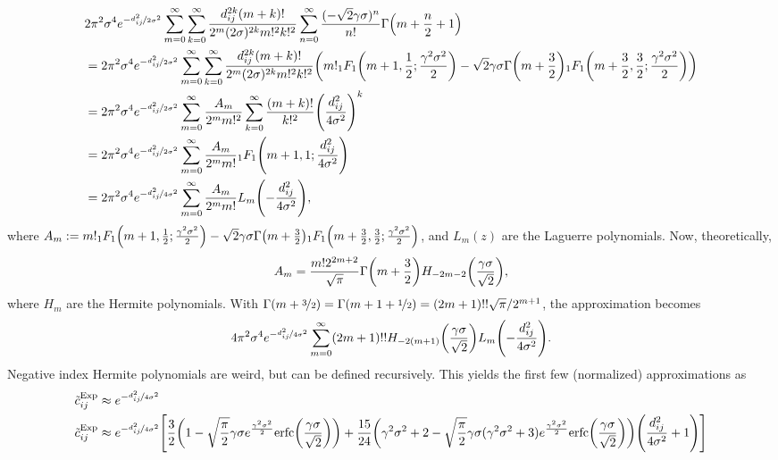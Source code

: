 \documentclass{article}
\begin{document}
\begin{align*}
    &2\pi^2\sigma^4e^{-\nicefrac{d_{ij}^2}{2\sigma^2}}\sum_{m=0}^\infty\sum_{k=0}^\infty \frac{d_{ij}^{2k}(m+k)!}{2^{m}(2\sigma)^{2k} m!^2 k!^2}\sum_{n=0}^\infty\frac{(-\sqrt{2}\gamma\sigma)^n}{n!}\Gamma\qty(m+\frac{n}{2}+1)\\
    &= 2\pi^2\sigma^4e^{-\nicefrac{d_{ij}^2}{2\sigma^2}}\sum_{m=0}^\infty\sum_{k=0}^\infty \frac{d_{ij}^{2k}(m+k)!}{2^{m}(2\sigma)^{2k} m!^2 k!^2}\qty(m! _1F_1\qty(m+1, \frac{1}{2}; \frac{\gamma^2\sigma^2}{2})-\sqrt{2}\gamma\sigma\Gamma\qty(m+\frac{3}{2}) {}_1F_1\qty(m+\frac{3}{2}, \frac{3}{2}; \frac{\gamma^2\sigma^2}{2}))\\
    &= 2\pi^2\sigma^4e^{-\nicefrac{d_{ij}^2}{2\sigma^2}}\sum_{m=0}^\infty \frac{A_m}{2^m m!^2}\sum_{k=0}^\infty \frac{(m+k)!}{k!^2}\qty(\frac{d_{ij}^2}{4\sigma^2})^{k}\\
    &= 2\pi^2\sigma^4e^{-\nicefrac{d_{ij}^2}{2\sigma^2}}\sum_{m=0}^\infty \frac{A_m}{2^m m!}{}_1F_1\qty(m+1, 1; \frac{d_{ij}^2}{4\sigma^2})\\
    &= 2\pi^2\sigma^4e^{-\nicefrac{d_{ij}^2}{4\sigma^2}}\sum_{m=0}^\infty \frac{A_m}{2^m m!}L_m\qty(-\frac{d_{ij}^2}{4\sigma^2}),
\end{align*}
where $A_m := m! _1F_1\qty(m+1, \frac{1}{2}; \frac{\gamma^2\sigma^2}{2})-\sqrt{2}\gamma\sigma\Gamma\qty(m+\frac{3}{2}) {}_1F_1\qty(m+\frac{3}{2}, \frac{3}{2}; \frac{\gamma^2\sigma^2}{2})$, and $L_m(z)$ are the Laguerre polynomials. Now, theoretically,
\begin{align*}
    A_m = \frac{m!2^{2m+2}}{\sqrt{\pi}}\Gamma\qty(m+\frac{3}{2})H_{-2m-2}\qty(\frac{\gamma\sigma}{\sqrt{2}}),
\end{align*}
where $H_m$ are the Hermite polynomials. With $\Gamma\qty(m+\nicefrac{3}{2}) = \Gamma\qty(m+1+\nicefrac{1}{2}) = (2m+1)!! \sqrt{\pi}/2^{m+1}$, the approximation becomes
\begin{align*}
    4\pi^2\sigma^4e^{-\nicefrac{d_{ij}^2}{4\sigma^2}}\sum_{m=0}^\infty (2m+1)!!H_{-2(m+1)}\qty(\frac{\gamma\sigma}{\sqrt{2}})L_m\qty(-\frac{d_{ij}^2}{4\sigma^2}).
\end{align*}
Negative index Hermite polynomials are weird, but can be defined recursively. This yields the first few (normalized) approximations as
\begin{align*}
    \Tilde{c}_{ij}^{\text{Exp}} &\approx e^{-\nicefrac{d_{ij}^2}{4\sigma^2}}\\
    \Tilde{c}_{ij}^{\text{Exp}} &\approx e^{-\nicefrac{d_{ij}^2}{4\sigma^2}}\qty[\frac{3}{2}\qty(1-\sqrt{\frac{\pi}{2}}\gamma \sigma e^{\frac{\gamma^2\sigma^2}{2}}\text{erfc}\qty(\frac{\gamma\sigma}{\sqrt{2}})) + \frac{15}{24}\qty(\gamma^2\sigma^2+2-\sqrt{\frac{\pi}{2}}\gamma \sigma(\gamma^2\sigma^2+3) e^{\frac{\gamma^2\sigma^2}{2}}\text{erfc}\qty(\frac{\gamma\sigma}{\sqrt{2}}))\qty(\frac{d_{ij}^2}{4\sigma^2}+1)]
\end{align*}
\end{document}
